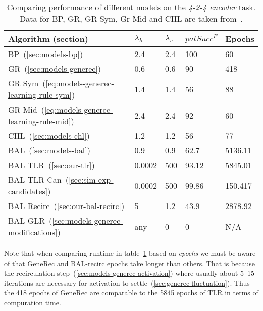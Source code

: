 \begin{table}[H] 
  \centering
    \begin{tabular}{|l|l|l|l|l|}
    \hline
    Algorithm (section)&$\lambda_h$&$\lambda_v$&$patSucc^F$ &Epochs\\ %
    \hline
    BP~(\ref{sec:models-bp}) &2.4 &2.4 &100&60\\ %
    \hline
    GR~(\ref{sec:models-generec}) &0.6 &0.6 &90&418\\ %
    \hline
    GR Sym~(\ref{eq:models-generec-learning-rule-sym}) &1.4 &1.4 &56&88\\ %
    \hline
    GR Mid~(\ref{eq:models-generec-learning-rule-mid}) &2.4 &2.4 &92&60\\ %
    \hline
    CHL~(\ref{sec:models-chl}) &1.2 &1.2 &56&77\\ %
    \hline
    BAL~(\ref{sec:models-bal})&0.9 &0.9 &62.7& 5136.11\\ %
    \hline
    BAL TLR~(\ref{sec:our-tlr})&0.0002  & 500&93.12&5845.01\\ %
    \hline
    BAL TLR Can~(\ref{sec:sim-exp-candidates})&0.0002&500&99.86&150.417\\ %
    \hline
    BAL Recirc~(\ref{sec:our-bal-recirc})&5&1.2&43.9&2878.92\\ %
    \hline
    BAL GLR~(\ref{sec:models-generec-modifications})& any & 0 & 0 & N/A \\ 
    \hline 
    \end{tabular}
  \caption{Comparing performance of different models on the \emph{4-2-4 encoder} task. Data for BP, GR, GR Sym, Gr Mid and CHL are taken from~\citet{o1996bio}.} 
  \label{tab:results-cmp-auto4}
\end{table}

Note that when comparing runtime in table~\ref{tab:results-cmp-auto4} based on \emph{epochs} we must be aware of that GeneRec and BAL-recirc epochs take longer than others. That is because the recirculation step~(\ref{sec:models-generec-activation}) where usually about 5--15 iterations are necessary for activation to settle~(\ref{sec:generec-fluctuation}). Thus the 418 epochs of GeneRec are comparable to the 5845 epochs of TLR in terms of compuration time. 
